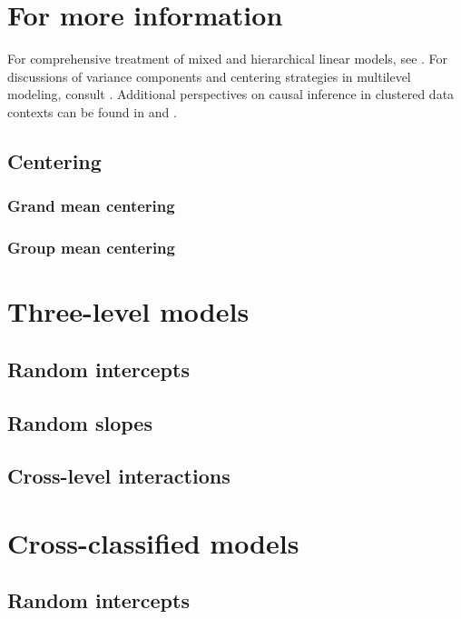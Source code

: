 \section*{For more information}
For comprehensive treatment of mixed and hierarchical linear models, see \citep{hlm}. For discussions of variance components and centering strategies in multilevel modeling, consult \citep{fox}. Additional perspectives on causal inference in clustered data contexts can be found in \citep{kenny1975quasi} and \citep{cameron2005microeconometrics}.

\subsection{Centering}
\subsubsection{Grand mean centering}
\subsubsection{Group mean centering}


\section{Three-level models}
\subsection{Random intercepts}
\subsection{Random slopes}
\subsection{Cross-level interactions}

\section{Cross-classified models}
\subsection{Random intercepts}


